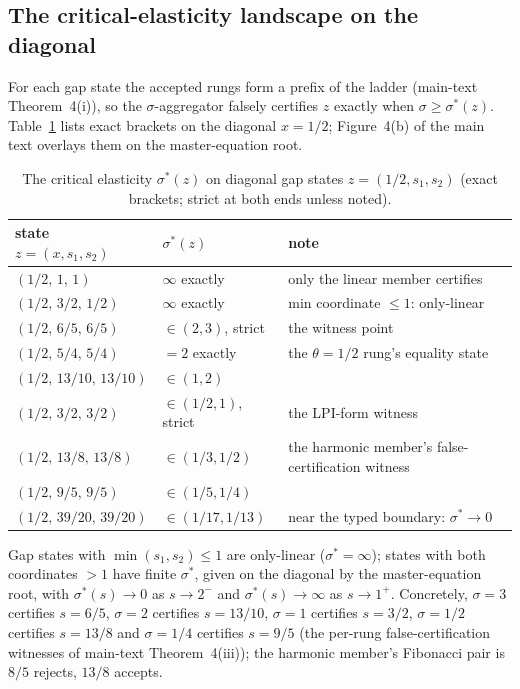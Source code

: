 \documentclass[preprint,11pt,authoryear]{elsarticle}
\theoremstyle{remark}
\begin{document}
\subsection{The critical-elasticity landscape on the diagonal}

For each gap state the accepted rungs form a prefix of the ladder (main-text Theorem~4(i)), so the $\sigma$-aggregator falsely certifies $z$ exactly when $\sigma\ge\sigma^*(z)$. Table~\ref{tab:sigmastar} lists exact brackets on the diagonal $x=1/2$; Figure~4(b) of the main text overlays them on the master-equation root.

\begin{table}[!htbp]
\centering\small
\caption{The critical elasticity $\sigma^*(z)$ on diagonal gap states $z=(1/2,s_1,s_2)$ (exact brackets; strict at both ends unless noted).}
\label{tab:sigmastar}
\begin{tabular}{@{}llp{6.4cm}@{}}
\toprule
state $z=(x,s_1,s_2)$ & $\sigma^*(z)$ & note \\
\midrule
$(1/2,\,1,\,1)$ & $\infty$ exactly & only the linear member certifies \\
$(1/2,\,3/2,\,1/2)$ & $\infty$ exactly & min coordinate $\le1$: only-linear \\
$(1/2,\,6/5,\,6/5)$ & $\in(2,3)$, strict & the witness point \\
$(1/2,\,5/4,\,5/4)$ & $=2$ exactly & the $\theta=1/2$ rung's equality state \\
$(1/2,\,13/10,\,13/10)$ & $\in(1,2)$ & \\
$(1/2,\,3/2,\,3/2)$ & $\in(1/2,1)$, strict & the LPI-form witness \\
$(1/2,\,13/8,\,13/8)$ & $\in(1/3,1/2)$ & the harmonic member's false-certification witness \\
$(1/2,\,9/5,\,9/5)$ & $\in(1/5,1/4)$ & \\
$(1/2,\,39/20,\,39/20)$ & $\in(1/17,1/13)$ & near the typed boundary: $\sigma^*\to0$ \\
\bottomrule
\end{tabular}
\end{table}

Gap states with $\min(s_1,s_2)\le1$ are only-linear ($\sigma^*=\infty$); states with both coordinates $>1$ have finite $\sigma^*$, given on the diagonal by the master-equation root, with $\sigma^*(s)\to0$ as $s\to2^-$ and $\sigma^*(s)\to\infty$ as $s\to1^+$. Concretely, $\sigma=3$ certifies $s=6/5$, $\sigma=2$ certifies $s=13/10$, $\sigma=1$ certifies $s=3/2$, $\sigma=1/2$ certifies $s=13/8$ and $\sigma=1/4$ certifies $s=9/5$ (the per-rung false-certification witnesses of main-text Theorem~4(iii)); the harmonic member's Fibonacci pair is $8/5$ rejects, $13/8$ accepts.
\end{document}

